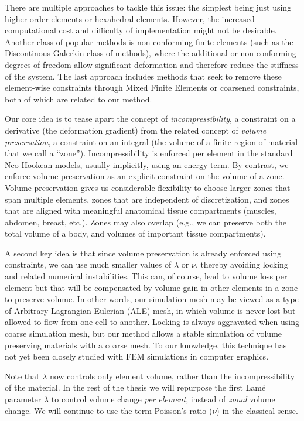 There are multiple approaches to tackle this issue: the simplest being
just using higher-order elements or hexahedral elements. However, the
increased computational cost and difficulty of implementation might
not be desirable. Another class of popular methods is non-conforming
finite elements (such as the Discontinous Galerkin class of methods),
where the additional or non-conforming degrees of freedom allow
significant deformation and therefore reduce the stiffness of the
system.  The last approach includes methods that seek to remove these
element-wise constraints through Mixed Finite Elements or coarsened
constraints, both of which are related to our method.

Our core idea is to tease apart the concept of {\em
	incompressibility}, a constraint on a derivative (the deformation
gradient) from the related concept of {\em volume preservation}, a
constraint on an integral (the volume of a finite region of material
that we call a ``zone''). Incompressibility is enforced per element in
the standard Neo-Hookean models, usually implicitly, using an energy
term. By contrast, we enforce volume preservation as an explicit
constraint on the volume of a zone. Volume preservation gives us
considerable flexibility to choose larger zones that span multiple
elements, zones that are independent of discretization, and zones that
are aligned with meaningful anatomical tissue compartments (muscles,
abdomen, breast, etc.). Zones may also overlap (e.g., we can preserve
both the total volume of a body, and volumes of important tissue
compartments).

A second key idea is that since volume preservation is already
enforced using constraints, we can use much smaller values of
$\lambda$ or $\nu$, thereby avoiding locking and related numerical
instabilities. This can, of course, lead to volume loss per element
but that will be compensated by volume gain in other elements in a
zone to preserve volume. In other words, our simulation mesh may be
viewed as a type of Arbitrary Lagrangian-Eulerian (ALE) mesh, in which
volume is never lost but allowed to flow from one cell to another. 
Locking is always aggravated when using coarse simulation mesh, but our
method allows a stable simulation of volume preserving materials
with a coarse mesh.
To our knowledge, this technique has not yet been closely studied with
FEM simulations in computer graphics.

Note that $\lambda$ now controls only element volume, rather than the
incompressibility of the material. In the rest of the thesis we will
repurpose the first Lam\'e parameter $\lambda$ to control volume
change \emph{per element}, instead of \emph{zonal} volume change.
We will continue to use the term Poisson's ratio ($\nu$) in the
classical sense.

